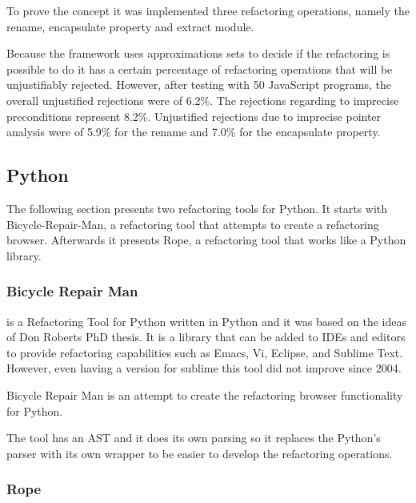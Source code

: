 To prove the concept it was implemented three refactoring operations, namely the rename, encapsulate property and extract module.


Because the framework uses approximations sets to decide if the refactoring is possible to do it has a certain percentage of refactoring operations that will be unjustifiably rejected.
However, after testing with 50 JavaScript programs, the overall unjustified rejections were of 6.2\%. 
The rejections regarding to imprecise preconditions represent 8.2\%.
Unjustified rejections due to imprecise pointer analysis were of 5.9\% for the rename and 7.0\% for the encapsulate property. 


\subsection{Python}

The following section presents two refactoring tools for Python. 
It starts with Bicycle-Repair-Man, a refactoring tool that attempts to create a refactoring browser. 
Afterwards it presents Rope, a refactoring tool that works like a Python library.

\subsubsection{Bicycle Repair Man}

 is a Refactoring Tool for Python written in Python and it was based on the ideas of Don Roberts PhD thesis. 
 It is a library that can be added to IDEs and editors to provide refactoring capabilities such as Emacs, Vi, Eclipse, and Sublime Text. 
 However, even having a version for sublime this tool did not improve since 2004.

Bicycle Repair Man is an attempt to create the refactoring browser functionality for Python. 

The tool has an AST and it does its own parsing so it replaces the Python's parser with its own wrapper to be easier to develop the refactoring operations.


\subsubsection{Rope}

